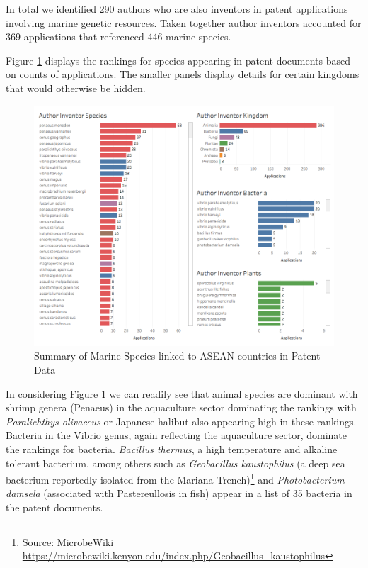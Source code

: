 \documentclass[]{book}
\let\rmarkdownfootnote\footnote%
\def\footnote{\protect\rmarkdownfootnote}
\theoremstyle{definition}
\theoremstyle{definition}
\theoremstyle{definition}
\theoremstyle{remark}
\begin{document}
In total we identified 290 authors who are also inventors in patent
applications involving marine genetic resources. Taken together author
inventors accounted for 369 applications that referenced 446 marine
species.

Figure \ref{fig:authorinventorspecies} displays the rankings for species
appearing in patent documents based on counts of applications. The
smaller panels display details for certain kingdoms that would otherwise
be hidden.

\begin{figure}

{\centering \includegraphics[width=1\linewidth]{images-patents/author_inventor_species_dashboard} 

}

\caption{Summary of Marine Species linked to ASEAN countries in Patent Data}\label{fig:authorinventorspecies}
\end{figure}

In considering Figure \ref{fig:authorinventorspecies} we can readily see
that animal species are dominant with shrimp genera (Penaeus) in the
aquaculture sector dominating the rankings with \emph{Paralichthys
olivaceus} or Japanese halibut also appearing high in these rankings.
Bacteria in the Vibrio genus, again reflecting the aquaculture sector,
dominate the rankings for bacteria. \emph{Bacillus thermus}, a high
temperature and alkaline tolerant bacterium, among others such as
\emph{Geobacillus kaustophilus} (a deep sea bacterium reportedly
isolated from the Mariana Trench)\footnote{Source: MicrobeWiki
  \url{https://microbewiki.kenyon.edu/index.php/Geobacillus_kaustophilus}}
and \emph{Photobacterium damsela} (associated with Pastereullosis in
fish) appear in a list of 35 bacteria in the patent documents.
\end{document}
